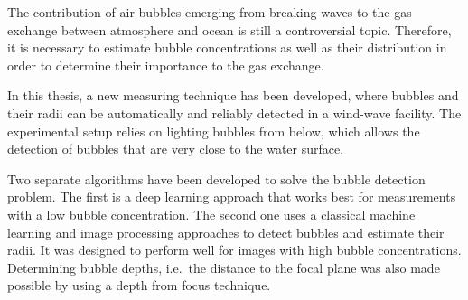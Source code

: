 The contribution of air bubbles emerging from breaking waves to the gas exchange between atmosphere and ocean is still a controversial topic. Therefore, it is necessary to estimate bubble concentrations as well as their distribution in order to determine their importance to the gas exchange. 

In this thesis, a new measuring technique has been developed, where bubbles and their radii can be automatically and reliably detected in a wind-wave facility. 
The experimental setup relies on lighting bubbles from below, which allows the detection of bubbles that are very close to the water surface. 

Two separate algorithms have been developed to solve the bubble detection problem. The first is a deep learning approach that works best for measurements with a low bubble concentration. The second one uses a classical machine learning and image processing approaches to detect bubbles and estimate their radii. It was designed to perform well for images with high bubble concentrations. Determining bubble depths, i.e.\ the distance to the focal plane was also made possible by using a depth from focus technique. 